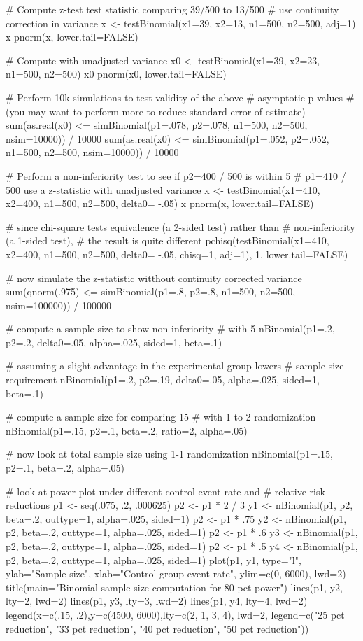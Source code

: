 \begin{Examples}
\begin{ExampleCode}
# Compute z-test test statistic comparing 39/500 to 13/500
# use continuity correction in variance
x <- testBinomial(x1=39, x2=13, n1=500, n2=500, adj=1)
x
pnorm(x, lower.tail=FALSE)

# Compute with unadjusted variance
x0 <- testBinomial(x1=39, x2=23, n1=500, n2=500)
x0
pnorm(x0, lower.tail=FALSE)

# Perform 10k simulations to test validity of the above
# asymptotic p-values 
# (you may want to perform more to reduce standard error of estimate)
sum(as.real(x0) <= 
    simBinomial(p1=.078, p2=.078, n1=500, n2=500, nsim=10000)) / 10000
sum(as.real(x0) <= 
    simBinomial(p1=.052, p2=.052, n1=500, n2=500, nsim=10000)) / 10000

# Perform a non-inferiority test to see if p2=400 / 500 is within 5
# p1=410 / 500 use a z-statistic with unadjusted variance
x <- testBinomial(x1=410, x2=400, n1=500, n2=500, delta0= -.05)
x
pnorm(x, lower.tail=FALSE)

# since chi-square tests equivalence (a 2-sided test) rather than
# non-inferiority (a 1-sided test), 
# the result is quite different
pchisq(testBinomial(x1=410, x2=400, n1=500, n2=500, delta0= -.05, 
                    chisq=1, adj=1), 1, lower.tail=FALSE)

# now simulate the z-statistic witthout continuity corrected variance
sum(qnorm(.975) <= 
    simBinomial(p1=.8, p2=.8, n1=500, n2=500, nsim=100000)) / 100000

# compute a sample size to show non-inferiority
# with 5%
nBinomial(p1=.2, p2=.2, delta0=.05, alpha=.025, sided=1, beta=.1)

# assuming a slight advantage in the experimental group lowers
# sample size requirement
nBinomial(p1=.2, p2=.19, delta0=.05, alpha=.025, sided=1, beta=.1)

# compute a sample size for comparing 15%
# with 1 to 2 randomization
nBinomial(p1=.15, p2=.1, beta=.2, ratio=2, alpha=.05)

# now look at total sample size using 1-1 randomization
nBinomial(p1=.15, p2=.1, beta=.2, alpha=.05)

# look at power plot under different control event rate and
# relative risk reductions
p1 <- seq(.075, .2, .000625)
p2 <- p1 * 2 / 3
y1 <- nBinomial(p1, p2, beta=.2, outtype=1, alpha=.025, sided=1)
p2 <- p1 * .75
y2 <- nBinomial(p1, p2, beta=.2, outtype=1, alpha=.025, sided=1)
p2 <- p1 * .6
y3 <- nBinomial(p1, p2, beta=.2, outtype=1, alpha=.025, sided=1)
p2 <- p1 * .5
y4 <- nBinomial(p1, p2, beta=.2, outtype=1, alpha=.025, sided=1)
plot(p1, y1, type="l", ylab="Sample size",
     xlab="Control group event rate", ylim=c(0, 6000), lwd=2)
title(main="Binomial sample size computation for 80 pct power")
lines(p1, y2, lty=2, lwd=2)
lines(p1, y3, lty=3, lwd=2)
lines(p1, y4, lty=4, lwd=2)
legend(x=c(.15, .2),y=c(4500, 6000),lty=c(2, 1, 3, 4), lwd=2,
       legend=c("25 pct reduction", "33 pct reduction",
                "40 pct reduction", "50 pct reduction"))
\end{ExampleCode}
\end{Examples}

